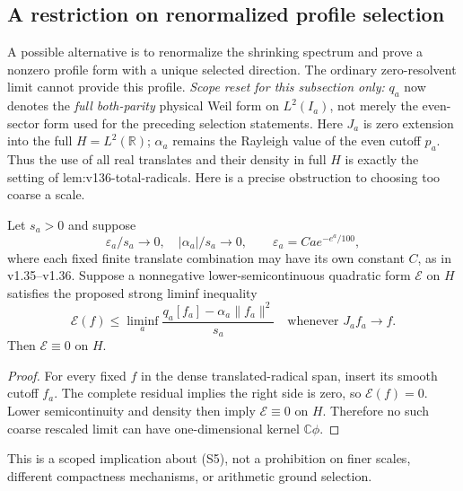 \subsection*{A restriction on renormalized profile selection}

A possible alternative is to renormalize the shrinking spectrum and
prove a nonzero profile form with a unique selected direction.
The ordinary zero-resolvent limit cannot provide this profile.
\emph{Scope reset for this subsection only:} $q_a$ now denotes the
\emph{full both-parity} physical Weil form on $L^2(I_a)$, not merely
the even-sector form used for the preceding selection statements.
Here $J_a$ is zero extension into the full $H=L^2(\mathbb R)$;
$\alpha_a$ remains the Rayleigh value of the even cutoff $p_a$.
Thus the use of all real translates and their density in full $H$
is exactly the setting of \textup{lem:v136-total-radicals}.
Here is a precise obstruction to choosing too coarse a scale.
\begin{proposition}
\label{prop:ns43-ccm-coarse-profile}
Let $s_a>0$ and suppose
\[
 \varepsilon_a/s_a\to0,\quad |\alpha_a|/s_a\to0,
 \qquad \varepsilon_a=Ca e^{-e^a/100},
\]
where each fixed finite translate combination may have its own constant
$C$, as in v1.35--v1.36. Suppose a nonnegative lower-semicontinuous
quadratic form $\mathcal E$ on $H$ satisfies the proposed strong
liminf inequality
\[
 \mathcal E(f)\le\liminf_a
 \frac{q_a[f_a]-\alpha_a\|f_a\|^2}{s_a}
 \quad\text{whenever }J_af_a\to f.
 \tag{S5}
\]
Then $\mathcal E\equiv0$ on $H$.
\end{proposition}
\begin{proof}
For every fixed $f$ in the dense translated-radical span, insert its
smooth cutoff $f_a$. The complete residual implies the right side is
zero, so $\mathcal E(f)=0$. Lower semicontinuity and density then imply
$\mathcal E\equiv0$ on $H$. Therefore no such coarse rescaled limit
can have one-dimensional kernel $\mathbb C\phi$.
\end{proof}
This is a scoped implication about (S5), not a prohibition on finer
scales, different compactness mechanisms, or arithmetic ground selection.

